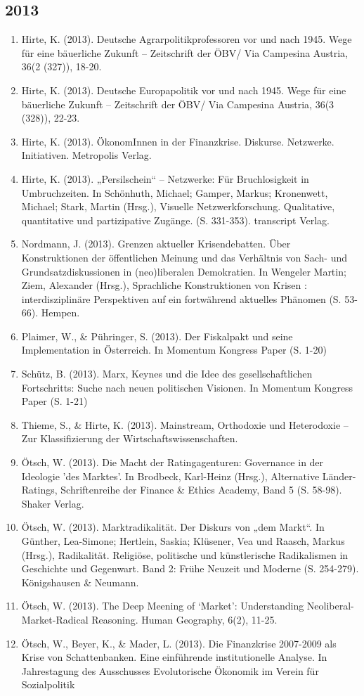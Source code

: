 \subsection*{2013}
\begin{enumerate}
	 \item Hirte, K. (2013). Deutsche Agrarpolitikprofessoren vor und nach 1945. Wege für eine bäuerliche Zukunft – Zeitschrift der ÖBV/ Via Campesina Austria, 36(2 (327)), 18-20.
	 \item Hirte, K. (2013). Deutsche Europapolitik vor und nach 1945. Wege für eine bäuerliche Zukunft – Zeitschrift der ÖBV/ Via Campesina Austria, 36(3 (328)), 22-23.
	 \item Hirte, K. (2013). ÖkonomInnen in der Finanzkrise. Diskurse. Netzwerke. Initiativen. Metropolis Verlag.
	 \item Hirte, K. (2013). „Persilschein“ – Netzwerke: Für Bruchlosigkeit in Umbruchzeiten. In Schönhuth, Michael; Gamper, Markus; Kronenwett, Michael; Stark, Martin (Hrsg.), Visuelle Netzwerkforschung. Qualitative, quantitative und partizipative Zugänge. (S. 331-353). transcript Verlag.
	 \item Nordmann, J. (2013). Grenzen aktueller Krisendebatten. Über Konstruktionen der öffentlichen Meinung und das Verhältnis von Sach- und Grundsatzdiskussionen in (neo)liberalen Demokratien. In Wengeler Martin; Ziem, Alexander (Hrsg.), Sprachliche Konstruktionen von Krisen : interdisziplinäre Perspektiven auf ein fortwährend aktuelles Phänomen (S. 53-66). Hempen.
	 \item Plaimer, W., \& Pühringer, S. (2013). Der Fiskalpakt und seine Implementation in Österreich. In Momentum Kongress Paper (S. 1-20)
	 \item Schütz, B. (2013). Marx, Keynes und die Idee des gesellschaftlichen Fortschritts: Suche nach neuen politischen Visionen. In Momentum Kongress Paper (S. 1-21)
	 \item Thieme, S., \& Hirte, K. (2013). Mainstream, Orthodoxie und Heterodoxie – Zur Klassifizierung der Wirtschaftswissenschaften.
	 \item Ötsch, W. (2013). Die Macht der Ratingagenturen: Governance in der Ideologie 'des Marktes'. In Brodbeck, Karl-Heinz (Hrsg.), Alternative Länder-Ratings, Schriftenreihe der Finance \& Ethics Academy, Band 5 (S. 58-98). Shaker Verlag.
	 \item Ötsch, W. (2013). Marktradikalität. Der Diskurs von „dem Markt“. In Günther, Lea-Simone; Hertlein, Saskia;  Klüsener, Vea und Raasch, Markus (Hrsg.), Radikalität. Religiöse, politische und künstlerische Radikalismen in Geschichte und Gegenwart. Band 2: Frühe Neuzeit und Moderne (S. 254-279). Königshausen \& Neumann.
	 \item Ötsch, W. (2013). The Deep Meening of ‘Market’: Understanding Neoliberal-Market-Radical Reasoning. Human Geography, 6(2), 11-25.
	 \item Ötsch, W., Beyer, K., \& Mader, L. (2013). Die Finanzkrise 2007-2009 als Krise von Schattenbanken. Eine einführende institutionelle Analyse. In Jahrestagung des Ausschusses Evolutorische Ökonomik im Verein für Sozialpolitik
\end{enumerate}
